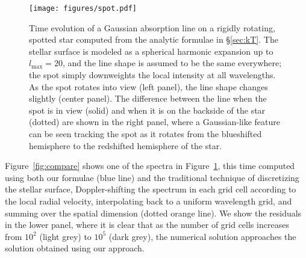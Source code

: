 \documentclass[modern]{aastex631}
\begin{document}
\begin{figure}[p!]
    \begin{centering}
        \texttt{[image: figures/spot.pdf]}
        \caption{%
            Time evolution of a Gaussian absorption line on a rigidly rotating, spotted star computed from the analytic formulae in \S\ref{sec:kT}.
            The stellar surface is modeled as a spherical harmonic expansion up to $l_\mathrm{max}=20$, and the line shape is assumed to be the same everywhere;
            the spot simply downweights the local intensity at all wavelengths.
            As the spot rotates into view (left panel), the line shape changes slightly (center panel). 
            The difference between the line when the spot is in view (solid) and when it is on the backside of the star (dotted) are shown in the right panel, where a Gaussian-like feature can be seen tracking the spot as it rotates from the blueshifted hemisphere to the redshifted hemisphere of the star.
        }
        \label{fig:spot}
    \end{centering}
\end{figure}

Figure~\ref{fig:compare} shows one of the spectra in Figure~\ref{fig:spot}, this time computed using both our formulae (blue line) and the traditional technique of discretizing the stellar surface, Doppler-shifting the spectrum in each grid cell according to the local radial velocity, interpolating back to a uniform wavelength grid, and summing over the spatial dimension (dotted orange line). 
We show the residuals in the lower panel, where it is clear that as the number of grid cells increases from $10^2$ (light grey) to $10^5$ (dark grey), the numerical solution approaches the solution obtained using our approach.

\end{document}
